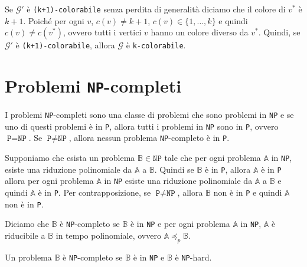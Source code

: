     Se $\mathcal{G}'$ è \texttt{(k+1)-colorabile} senza perdita di generalità diciamo che il colore di $v^*$ è $k+1$.
    Poiché per ogni $v$, $c(v) \neq k+1$, $c(v) \in \{1,\dots,k\}$ e quindi $c(v) \neq c(v^*)$, ovvero tutti i vertici $v$ hanno un colore diverso
    da $v^*$. Quindi, se $\mathcal{G'}$ è \texttt{(k+1)-colorabile},
    allora $\mathcal{G}$ è \texttt{k-colorabile}.
\section{Problemi \texttt{NP}-completi}
I problemi \texttt{NP}-completi sono una classe di problemi che sono problemi in \texttt{NP} e se uno 
di questi problemi è in \texttt{P}, allora tutti i problemi in \texttt{NP} sono in \texttt{P}, 
ovvero $\texttt{P} = \texttt{NP}$. Se $\texttt{P} \neq \texttt{NP}$, allora nessun problema
\texttt{NP}-completo è in \texttt{P}.
\begin{figure}[H]
    \centering
\end{figure}
Supponiamo che esista un problema $\mathbb{B}\in \texttt{NP}$ tale che per ogni problema $\mathbb{A}$ in \texttt{NP},
esiste una riduzione polinomiale da $\mathbb{A}$ a $\mathbb{B}$. 
Quindi se $\mathbb{B}$ è in \texttt{P}, allora $\mathbb{A}$ è in \texttt{P} allora 
per ogni problema $\mathbb{A}$ in \texttt{NP} esiste una riduzione polinomiale da
$\mathbb{A}$ a $\mathbb{B}$ e quindi $\mathbb{A}$ è in \texttt{P}.
Per contrapposizione, se $\texttt{P} \neq \texttt{NP}$,
allora $\mathbb{B}$ non è in \texttt{P} e quindi $\mathbb{A}$ non è in \texttt{P}.

Diciamo che $\mathbb{B}$ è \texttt{NP}-completo se $\mathbb{B}$ è in \texttt{NP} e
per ogni problema $\mathbb{A}$ in \texttt{NP}, $\mathbb{A}$ è riducibile a $\mathbb{B}$ in tempo polinomiale, 
ovvero $\mathbb{A} \preceq_p \mathbb{B}$. 

\begin{tcolorbox}
    Un problema $\mathbb{B}$ è \texttt{NP}-completo se $\mathbb{B}$ è in \texttt{NP}
    e $\mathbb{B}$ è \texttt{NP}-hard.
\end{tcolorbox}

